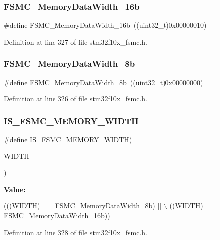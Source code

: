 \subsubsection{\texorpdfstring{F\+S\+M\+C\+\_\+\+Memory\+Data\+Width\+\_\+16b}{FSMC\_MemoryDataWidth\_16b}}
{\footnotesize\ttfamily \#define F\+S\+M\+C\+\_\+\+Memory\+Data\+Width\+\_\+16b~((uint32\+\_\+t)0x00000010)}



Definition at line 327 of file stm32f10x\+\_\+fsmc.\+h.

\mbox{\label{group___f_s_m_c___data___width_ga5753e089830f19af70a724766e3c329f}} 
\subsubsection{\texorpdfstring{F\+S\+M\+C\+\_\+\+Memory\+Data\+Width\+\_\+8b}{FSMC\_MemoryDataWidth\_8b}}
{\footnotesize\ttfamily \#define F\+S\+M\+C\+\_\+\+Memory\+Data\+Width\+\_\+8b~((uint32\+\_\+t)0x00000000)}



Definition at line 326 of file stm32f10x\+\_\+fsmc.\+h.

\mbox{\label{group___f_s_m_c___data___width_ga003d52b62f5950fb041f73f15ce20171}} 
\subsubsection{\texorpdfstring{I\+S\+\_\+\+F\+S\+M\+C\+\_\+\+M\+E\+M\+O\+R\+Y\+\_\+\+W\+I\+D\+TH}{IS\_FSMC\_MEMORY\_WIDTH}}
{\footnotesize\ttfamily \#define I\+S\+\_\+\+F\+S\+M\+C\+\_\+\+M\+E\+M\+O\+R\+Y\+\_\+\+W\+I\+D\+TH(\begin{DoxyParamCaption}\item[{}]{W\+I\+D\+TH }\end{DoxyParamCaption})}

{\bfseries Value\+:}
\begin{DoxyCode}
(((WIDTH) == \hyperlink{group___f_s_m_c___data___width_ga5753e089830f19af70a724766e3c329f}{FSMC\_MemoryDataWidth\_8b}) || \(\backslash\)
                                     ((WIDTH) == \hyperlink{group___f_s_m_c___data___width_ga65d85c3072e6790ae760ca2248e46df6}{FSMC\_MemoryDataWidth\_16b}))
\end{DoxyCode}


Definition at line 328 of file stm32f10x\+\_\+fsmc.\+h.

